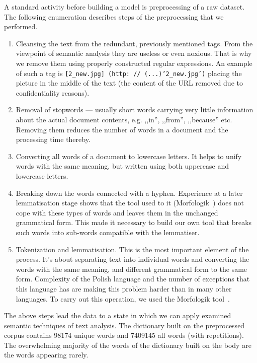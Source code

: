 \documentclass[twoside,twocolumn]{article}
\begin{document}
	A standard activity before building a model is preprocessing of a raw dataset. The following enumeration describes steps of the preprocessing that we performed.
	\begin{enumerate}
		
		\item Cleansing the text from the redundant, previously mentioned tags. From the viewpoint of semantic analysis they are useless or even noxious. That is why we remove them using properly constructed regular expressions. An example of such a tag is \texttt{[2\_new.jpg] (http: // (...)'2\_new.jpg')} placing the picture in the middle of the text (the content of the URL removed due to confidentiality reasons).
		
		\item Removal of stopwords --- usually short words carrying very little information about the actual document contents, e.g. ,,in'', ,,from'', ,,because'' etc. Removing them reduces the number of words in a document and the processing time thereby.
		
		\item Converting all words of a document to lowercase letters. It helps to unify words with the same meaning, but written using both uppercase and lowercase letters.
		
		\item Breaking down the words connected with a hyphen. Experience at a later lemmatisation stage shows that the tool used to it (Morfologik~\cite{morfologik}) does not cope with these types of words and leaves them in the unchanged grammatical form. This made it necessary to build our own tool that breaks such words into sub-words compatible with the lemmatiser.
		
		\item Tokenization and lemmatisation. This is the most important element of the process. It's about separating text into individual words and converting the words with the same meaning, and different grammatical form to the same form. Complexity of the Polish language and the number of exceptions that this language has are making this problem harder than in many other languages. To carry out this operation, we used the Morfologik tool~\cite{morfologik}.
	
	\end{enumerate}
	
	The above steps lead the data to a state in which we can apply examined semantic techniques of text analysis. The dictionary built on the preprocessed corpus contains 98174 unique	words and 7409145 all words (with repetitions).	The overwhelming majority of the words of the dictionary built on the body are the words appearing rarely.
\end{document}
